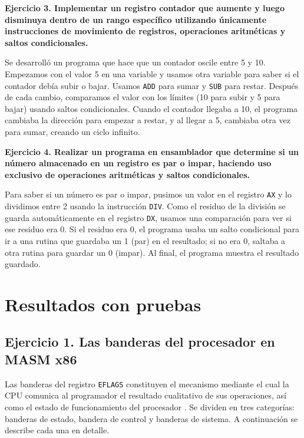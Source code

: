 \documentclass[a4paper,12pt]{article}
\begin{document}
\textbf{Ejercicio 3. Implementar un registro contador que aumente y luego disminuya dentro de un rango específico utilizando únicamente instrucciones de movimiento de registros, operaciones aritméticas y saltos condicionales.}

Se desarrolló un programa que hace que un contador oscile entre 5 y 10. Empezamos con el valor 5 en una variable y usamos otra variable para saber si el contador debía subir o bajar. Usamos \texttt{ADD} para sumar y \texttt{SUB} para restar. Después de cada cambio, comparamos el valor con los límites (10 para subir y 5 para bajar) usando saltos condicionales. Cuando el contador llegaba a 10, el programa cambiaba la dirección para empezar a restar, y al llegar a 5, cambiaba otra vez para sumar, creando un ciclo infinito.

\textbf{Ejercicio 4. Realizar un programa en ensamblador que determine si un número almacenado en un registro es par o impar, haciendo uso exclusivo de operaciones aritméticas y saltos condicionales.}

Para saber si un número es par o impar, pusimos un valor en el registro \texttt{AX} y lo dividimos entre 2 usando la instrucción \texttt{DIV}. Como el residuo de la división se guarda automáticamente en el registro \texttt{DX}, usamos una comparación para ver si ese residuo era 0. Si el residuo era 0, el programa usaba un salto condicional para ir a una rutina que guardaba un 1 (par) en el resultado; si no era 0, saltaba a otra rutina para guardar un 0 (impar). Al final, el programa muestra el resultado guardado.

\section{Resultados con pruebas}
\subsection{Ejercicio 1. Las banderas del procesador en MASM x86}

Las banderas del registro \texttt{EFLAGS} constituyen el mecanismo mediante el cual la CPU comunica al programador el resultado cualitativo de sus operaciones, así como el estado de funcionamiento del procesador \cite{stallings2019computer}. Se dividen en tres categorías: banderas de estado, bandera de control y banderas de sistema. A continuación se describe cada una en detalle.
\end{document}
